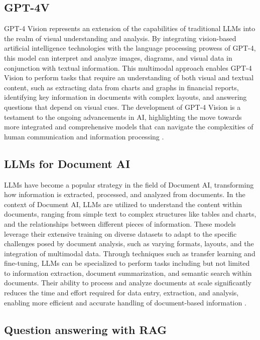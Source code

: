 \documentclass[english, 12pt, a4paper, elec, utf8, a-2b, online]{aaltothesis}
\begin{document}
\subsection{GPT-4V}

GPT-4 Vision represents an extension of the capabilities of traditional \ac{LLM}s into the realm of visual understanding and analysis.
By integrating vision-based artificial intelligence technologies with the language processing prowess of GPT-4, this model can interpret and analyze images, diagrams, and visual data in conjunction with textual information.
This multimodal approach enables GPT-4 Vision to perform tasks that require an understanding of both visual and textual content, such as extracting data from charts and graphs in financial reports, identifying key information in documents with complex layouts, and answering questions that depend on visual cues.
The development of GPT-4 Vision is a testament to the ongoing advancements in AI, highlighting the move towards more integrated and comprehensive models that can navigate the complexities of human communication and information processing \cite{2023GPT4VisionSC}.

\subsection{\ac{LLM}s for Document AI}

\ac{LLM}s have become a popular strategy in the field of Document AI, transforming how information is extracted, processed, and analyzed from documents.
In the context of Document AI, \ac{LLM}s are utilized to understand the content within documents, ranging from simple text to complex structures like tables and charts, and the relationships between different pieces of information.
These models leverage their extensive training on diverse datasets to adapt to the specific challenges posed by document analysis, such as varying formats, layouts, and the integration of multimodal data.
Through techniques such as transfer learning and fine-tuning, \ac{LLM}s can be specialized to perform tasks including but not limited to information extraction, document summarization, and semantic search within documents.
Their ability to process and analyze documents at scale significantly reduces the time and effort required for data entry, extraction, and analysis, enabling more efficient and accurate handling of document-based information \cite{}.

\subsection{Question answering with \ac{RAG}}
\end{document}
